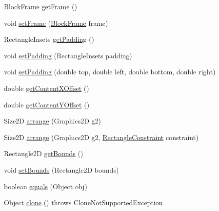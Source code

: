 \begin{DoxyCompactItemize}
\item 
\mbox{\hyperlink{interfaceorg_1_1jfree_1_1chart_1_1block_1_1_block_frame}{Block\+Frame}} \mbox{\hyperlink{classorg_1_1jfree_1_1chart_1_1block_1_1_abstract_block_a7ac4f2b628be6227111e529d568f162e}{get\+Frame}} ()
\item 
void \mbox{\hyperlink{classorg_1_1jfree_1_1chart_1_1block_1_1_abstract_block_a44b7622fb43df6da2295e792302359d9}{set\+Frame}} (\mbox{\hyperlink{interfaceorg_1_1jfree_1_1chart_1_1block_1_1_block_frame}{Block\+Frame}} frame)
\item 
Rectangle\+Insets \mbox{\hyperlink{classorg_1_1jfree_1_1chart_1_1block_1_1_abstract_block_ac5c667ddd4fdec045fd55f400aa5adb0}{get\+Padding}} ()
\item 
void \mbox{\hyperlink{classorg_1_1jfree_1_1chart_1_1block_1_1_abstract_block_a36bd3bfe0f4696d0fd4f488260b0b0fc}{set\+Padding}} (Rectangle\+Insets padding)
\item 
void \mbox{\hyperlink{classorg_1_1jfree_1_1chart_1_1block_1_1_abstract_block_a246f6e705ab8e3ee615bb534be91d1c5}{set\+Padding}} (double top, double left, double bottom, double right)
\item 
double \mbox{\hyperlink{classorg_1_1jfree_1_1chart_1_1block_1_1_abstract_block_a7ef10497b6cb5b58586f0420732c10ec}{get\+Content\+X\+Offset}} ()
\item 
double \mbox{\hyperlink{classorg_1_1jfree_1_1chart_1_1block_1_1_abstract_block_afa40c60e4938dd89537383b31894234f}{get\+Content\+Y\+Offset}} ()
\item 
Size2D \mbox{\hyperlink{classorg_1_1jfree_1_1chart_1_1block_1_1_abstract_block_a1f3617d27079faffb8a7f5f7b7af412f}{arrange}} (Graphics2D g2)
\item 
Size2D \mbox{\hyperlink{classorg_1_1jfree_1_1chart_1_1block_1_1_abstract_block_a151867f45dee9e5b69118ba6bdf93693}{arrange}} (Graphics2D g2, \mbox{\hyperlink{classorg_1_1jfree_1_1chart_1_1block_1_1_rectangle_constraint}{Rectangle\+Constraint}} constraint)
\item 
Rectangle2D \mbox{\hyperlink{classorg_1_1jfree_1_1chart_1_1block_1_1_abstract_block_a0fc9bf8ea47727f8c10e6ea4c8fe7622}{get\+Bounds}} ()
\item 
void \mbox{\hyperlink{classorg_1_1jfree_1_1chart_1_1block_1_1_abstract_block_a3e37dd75e1c2b3a7ae7111782e2610f5}{set\+Bounds}} (Rectangle2D bounds)
\item 
boolean \mbox{\hyperlink{classorg_1_1jfree_1_1chart_1_1block_1_1_abstract_block_acf188536400aafc2350a4b7f3585790f}{equals}} (Object obj)
\item 
Object \mbox{\hyperlink{classorg_1_1jfree_1_1chart_1_1block_1_1_abstract_block_a4244c031ab17030862f4af2ca72873bc}{clone}} ()  throws Clone\+Not\+Supported\+Exception 
\end{DoxyCompactItemize}

